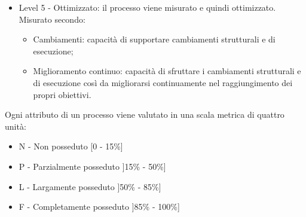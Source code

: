 \documentclass[../NormeDiProgetto_v4.0.0.tex]{subfiles}
\begin{document}
\begin{itemize}
\begin{itemize}
						\end{itemize}
					\item Level 5 - Ottimizzato: il processo viene misurato e quindi ottimizzato.
					Misurato secondo:
						\begin{itemize}
							\item Cambiamenti: capacità di supportare cambiamenti strutturali e di esecuzione;
							\item Miglioramento continuo: capacità di sfruttare i cambiamenti strutturali e di esecuzione così da migliorarsi continuamente nel raggiungimento dei propri obiettivi.
						\end{itemize}
					\end{itemize}
					Ogni attributo di un processo viene valutato in una scala metrica di quattro unità:
					\begin{itemize}
						\item N - Non posseduto [0 - 15\%]
						\item P - Parzialmente posseduto ]15\% - 50\%]
						\item L - Largamente posseduto ]50\% - 85\%]
						\item F - Completamente posseduto ]85\% - 100\%]
					\end{itemize}
					
\end{document}
